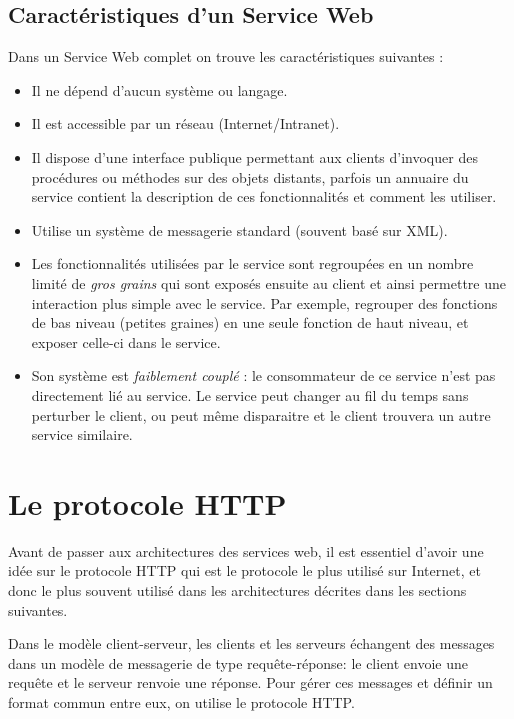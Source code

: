 \subsection{Caractéristiques d'un Service Web}
Dans un Service Web complet on trouve les caractéristiques suivantes \cite{refTutorialPointsWS} : 
\begin{itemize}
	\item Il ne dépend d'aucun système ou langage.
	\item Il est accessible par un réseau (Internet/Intranet).
	\item Il dispose d'une interface publique permettant aux clients d'invoquer des procédures ou méthodes sur des objets distants, parfois un annuaire du service contient la description de ces fonctionnalités et comment les utiliser.
	\item Utilise un système de messagerie standard (souvent basé sur XML).
	\item Les fonctionnalités utilisées par le service sont regroupées en un nombre limité de \emph{gros grains} qui sont exposés ensuite au client et ainsi permettre une interaction plus simple avec le service. Par exemple, regrouper des fonctions de bas niveau (petites graines) en une seule fonction de haut niveau, et exposer celle-ci dans le service.
	\item Son système est \emph{faiblement couplé} : le consommateur de ce service n'est pas directement lié au service. Le service peut changer au fil du temps sans perturber le client, ou peut même disparaitre et le client trouvera un autre service similaire.
\end{itemize}
		
\newpage
\section{Le protocole HTTP}
Avant de passer aux architectures des services web, il est essentiel d'avoir une idée sur le protocole HTTP qui est le protocole le plus utilisé sur Internet, et donc le plus souvent utilisé dans les architectures décrites dans les sections suivantes.

Dans le modèle client-serveur, les clients et les serveurs échangent des messages dans un modèle de messagerie de type requête-réponse: le client envoie une requête et le serveur renvoie une réponse.
Pour gérer ces messages et définir un format commun entre eux, on utilise le protocole HTTP\cite{HTTP}.

